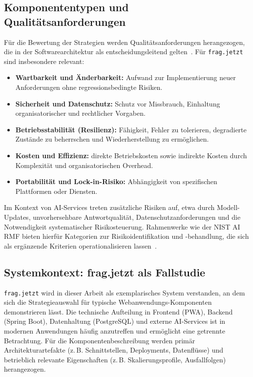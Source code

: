\subsection{Komponententypen und Qualitätsanforderungen}

Für die Bewertung der Strategien werden Qualitätsanforderungen herangezogen, die in der Softwarearchitektur als entscheidungsleitend gelten~\cite{richards2020fundamentals,ford2021hardparts}. 
Für \texttt{frag.jetzt} sind insbesondere relevant:
\begin{itemize}
  \item \textbf{Wartbarkeit und Änderbarkeit:} Aufwand zur Implementierung neuer Anforderungen ohne regressionsbedingte Risiken.
  \item \textbf{Sicherheit und Datenschutz:} Schutz vor Missbrauch, Einhaltung organisatorischer und rechtlicher Vorgaben.
  \item \textbf{Betriebsstabilität (Resilienz):} Fähigkeit, Fehler zu tolerieren, degradierte Zustände zu beherrschen und Wiederherstellung zu ermöglichen.
  \item \textbf{Kosten und Effizienz:} direkte Betriebskosten sowie indirekte Kosten durch Komplexität und organisatorischen Overhead.
  \item \textbf{Portabilität und Lock-in-Risiko:} Abhängigkeit von spezifischen Plattformen oder Diensten.
\end{itemize}

Im Kontext von AI-Services treten zusätzliche Risiken auf, etwa durch Modell-Updates, unvorhersehbare Antwortqualität, Datenschutzanforderungen und die Notwendigkeit 
systematischer Risikosteuerung. Rahmenwerke wie der NIST AI RMF bieten hierfür Kategorien zur Risikoidentifikation und -behandlung, die sich als ergänzende Kriterien operationalisieren lassen~\cite{nist2023airmf}.

\subsection{Systemkontext: frag.jetzt als Fallstudie}

\texttt{frag.jetzt} wird in dieser Arbeit als exemplarisches System verstanden, an dem sich die Strategieauswahl für typische Webanwendungs-Komponenten 
demonstrieren lässt. Die technische Aufteilung in Frontend (PWA), Backend (Spring Boot), Datenhaltung (PostgreSQL) und externe AI-Services ist in modernen Anwendungen häufig 
anzutreffen und ermöglicht eine getrennte Betrachtung. Für die Komponentenbeschreibung werden primär Architekturartefakte (z.\,B. Schnittstellen, Deployments, Datenflüsse) und 
betrieblich relevante Eigenschaften (z.\,B. Skalierungsprofile, Ausfallfolgen) herangezogen.

